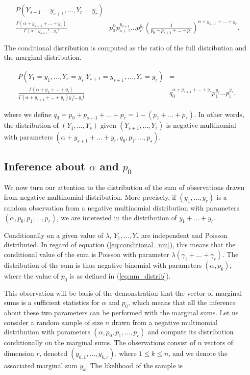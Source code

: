 \documentclass[12pt]{article}
\begin{document}
\begin{appendices}
    \begin{align*}
    P(Y_{s+1}=y_{s+1}, \ldots, Y_r=y_r) &= \\
      \frac{\Gamma(\alpha + y_{s+1} + \ldots + y_r)}
      {\Gamma(\alpha)y_{s+1}! \ldots y_r!} &p_0^{\alpha}p_{s+1}^{y_{s+1}}
      \ldots p_r^{y_r} \left(\frac{1}{p_0 + p_{s+1} + \ldots + p_r}
      \right)^{\alpha+y_{s+1} + \ldots + y_r}.
    \end{align*}

    The conditional distribution is computed as the ratio of the
    full distribution and the marginal distribution.

    \begin{align*}
      P(Y_1=y_1, \ldots, Y_s=y_s|Y_{s+1}=y_{s+1}, \ldots, Y_r=y_r) &= \\
      \frac{\Gamma(\alpha + y_1 + \ldots + y_r)}
      {\Gamma(\alpha+y_{s+1}+\ldots+y_r)y_1! \ldots y_s!}
      &q_0^{\alpha+y_{s+1}+\ldots+y_r}p_1^{y_1} \ldots p_i^{y_s},
    \end{align*}

    \noindent
    where we define
    $q_0 = p_0+p_{s+1}+\ldots+p_r = 1-(p_1+\ldots+p_s)$.
    In other words, the distribution of $(Y_1, \ldots, Y_s)$ given
    $(Y_{s+1}, \ldots, Y_r)$ is negative multinomial with parameters
    $(\alpha+y_{s+1}+\ldots+y_r, q_0, p_1, \ldots, p_s)$.

\subsection{Inference about $\alpha$ and $p_0$}
\label{sec:inference_alpha}

    We now turn our attention to the distribution of the sum of
    observations drawn from negative multinomial distribution. More
    precisely, if $(y_1, \ldots, y_r)$ is a random observation
    from a negative multinomial distribution with parameters
    $(\alpha, p_0, p_1, \ldots, p_r)$, we are interested in the
    distribution of $y_1 + \ldots + y_r$.

    Conditionally on a given value of $\lambda$, $Y_1, \ldots, Y_r$
    are independent and Poisson distributed. In regard of equation
    (\ref{eq:conditional_nm}), this means that the conditional value
    of the sum is Poisson with parameter
    $\lambda(\gamma_1 + \ldots + \gamma_r)$. The distribution of the
    sum is thus negative binomial with parameters $(\alpha, p_0)$,
    where the value of $p_0$ is as defined in (\ref{eq:nm_distrib}).

    This observation will be basis of the demonstration that the
    vector of marginal sums is a sufficient statistics for $\alpha$
    and $p_0$, which means that all the inference about these two
    parameters can be performed with the marginal sums. Let us
    consider a random sample of size $n$ drawn from a negative
    multinomial distribution with parameters
    $(\alpha, p_0, p_1, \ldots, p_r)$ and compute its distribution
    conditionally on the marginal sums. The observations consist of
    $n$ vectors of dimension $r$, denoted $(y_{k,1}, \ldots, y_{k,r})$,
    where $1 \leq k \leq n$, and we denote the associated marginal
    sum $y_k$. The likelihood of the sample is


\end{appendices}
\end{document}
